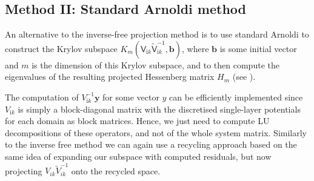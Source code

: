 \subsection{Method II: Standard Arnoldi method}

An alternative to the inverse-free projection method is to use standard Arnoldi to construct the Krylov subspace  
$K_{m}(\mathsf{V}_{\mathrm{i}k}\tilde{\mathsf{V}}_{\mathrm{i}k}^{-1}, \boldsymbol{b})$, where $\boldsymbol{b}$ is some 
initial vector and $m$ is the dimension of this Krylov subspace, and to then compute the eigenvalues of the resulting projected Hessenberg matrix $H_m$ (see \cite{saad2011numerical}).

The computation of $V_{\mathrm{i}k}^{-1}\boldsymbol{y}$ for some vector $y$ can be efficiently implemented since $V_{\mathrm{i}k}$ is simply a block-diagonal matrix with the
discretised single-layer potentials for each domain as block matrices. Hence, we just need to compute LU decompositions of these operators, and not of the whole system matrix.
Similarly to the inverse free method we can again use a recycling approach based on the same idea of expanding our subspace with computed residuals, but now projecting
$V_{ik}\tilde{V}_{ik}^{-1}$ onto the recycled space.


%


